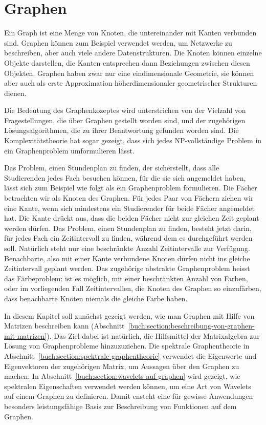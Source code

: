 %
%
%
\chapter{Graphen
\label{buch:chapter:graphen}}
\rhead{}
Ein Graph ist eine Menge von Knoten, die untereinander mit Kanten
verbunden sind.
%
Graphen können zum Beispiel verwendet werden, um Netzwerke zu beschreiben,
aber auch viele andere Datenstrukturen.
%
Die Knoten können einzelne Objekte darstellen, die Kanten entsprechen
dann Beziehungen zwischen diesen Objekten.
Graphen haben zwar nur eine eindimensionale Geometrie, sie können aber auch als
erste Approximation höherdimensionaler geometrischer Strukturen dienen.

Die Bedeutung des Graphenkozeptes wird unterstrichen von der Vielzahl
von Fragestellungen, die über Graphen gestellt worden sind, und der
zugehörigen Lösungsalgorithmen, die zu ihrer Beantwortung gefunden
worden sind.
Die Komplexitätstheorie hat sogar gezeigt, dass sich jedes NP-vollständige
Problem in ein Graphenproblem umformulieren lässt.
%

Das Problem, einen Stundenplan zu finden, der sicherstellt, dass
%
alle Studierenden jedes Fach besuchen können, für die sie sich
angemeldet haben, lässt sich zum Beispiel wie folgt als ein
Graphenproblem formulieren.
Die Fächer betrachten wir als Knoten des Graphen.
Für jedes Paar von Fächern ziehen wir eine Kante, wenn 
sich mindestens ein Studierender für beide Fächer angemeldet hat.
Die Kante drückt aus, dass die beiden Fächer nicht zur gleichen Zeit
geplant werden dürfen.
Das Problem, einen Stundenplan zu finden, besteht jetzt darin, für
jedes Fach ein Zeit\-intervall zu finden, während dem es durchgeführt
werden soll.
Natürlich steht nur eine beschränkte Anzahl Zeitintervalle zur Verfügung.
Benachbarte, also mit einer Kante verbundene Knoten dürfen nicht
ins gleiche Zeitintervall geplant werden.
Das zugehörige abstrakte Graphenproblem heisst das Färbeproblem: 
%
ist es möglich, mit einer beschränkten Anzahl von Farben, oder im
vorliegenden Fall Zeitintervallen, die Knoten
des Graphen so einzufärben, dass benachbarte Knoten niemals die gleiche
Farbe haben.

In diesem Kapitel soll zunächst gezeigt werden, wie man Graphen mit 
Hilfe von Matrizen beschreiben kann
(Abschnitt~\ref{buch:section:beschreibung-von-graphen-mit-matrizen}).
Das Ziel dabei ist natürlich, die Hilfsmittel der Matrixalgebra
zur Lösung von Graphenprobleme hinzuzuziehen.
Die spektrale Graphentheorie in
Abschnitt~\ref{buch:section:spektrale-graphentheorie} verwendet
die Eigenwerte und Eigenvektoren der zugehörigen Matrix, um Aussagen
über den Graphen zu machen.
%
In Abschnitt~\ref{buch:section:wavelets-auf-graphen} wird gezeigt,
wie spektralen Eigenschaften verwendet werden können, um eine
Art von Wavelets auf einem Graphen zu definieren.
Damit ensteht eine für gewisse Anwendungen besonders leistungsfähige
Basis zur Beschreibung von Funktionen auf dem Graphen.






